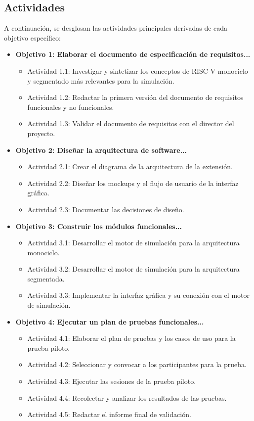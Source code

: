 \documentclass[12pt, letterpaper]{article}
\begin{document}
\subsection{Actividades}
A continuación, se desglosan las actividades principales derivadas de cada objetivo específico:
\begin{itemize}
    \item \textbf{Objetivo 1: Elaborar el documento de especificación de requisitos...}
    \begin{itemize}
        \item Actividad 1.1: Investigar y sintetizar los conceptos de RISC-V monociclo y segmentado más relevantes para la simulación.
        \item Actividad 1.2: Redactar la primera versión del documento de requisitos funcionales y no funcionales.
        \item Actividad 1.3: Validar el documento de requisitos con el director del proyecto.
    \end{itemize}
    \item \textbf{Objetivo 2: Diseñar la arquitectura de software...}
    \begin{itemize}
        \item Actividad 2.1: Crear el diagrama de la arquitectura de la extensión.
        \item Actividad 2.2: Diseñar los mockups y el flujo de usuario de la interfaz gráfica.
        \item Actividad 2.3: Documentar las decisiones de diseño.
    \end{itemize}
    \item \textbf{Objetivo 3: Construir los módulos funcionales...}
    \begin{itemize}
        \item Actividad 3.1: Desarrollar el motor de simulación para la arquitectura monociclo.
        \item Actividad 3.2: Desarrollar el motor de simulación para la arquitectura segmentada.
        \item Actividad 3.3: Implementar la interfaz gráfica y su conexión con el motor de simulación.
    \end{itemize}
    \item \textbf{Objetivo 4: Ejecutar un plan de pruebas funcionales...}
    \begin{itemize}
        \item Actividad 4.1: Elaborar el plan de pruebas y los casos de uso para la prueba piloto.
        \item Actividad 4.2: Seleccionar y convocar a los participantes para la prueba.
        \item Actividad 4.3: Ejecutar las sesiones de la prueba piloto.
        \item Actividad 4.4: Recolectar y analizar los resultados de las pruebas.
        \item Actividad 4.5: Redactar el informe final de validación.
    \end{itemize}
\end{itemize}
\end{document}
